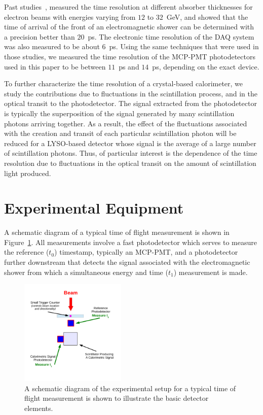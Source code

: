 \documentclass[12pt]{article}
\begin{document}
Past studies~\cite{MCPFastCaloNIMA}, measured the time
resolution at different absorber thicknesses for electron beams with
energies varying from $12$ to $32$~GeV, and showed that the 
time of arrival of the front of an electromagnetic shower
can be determined with a precision better than $20$~ps.
The electronic time resolution of the DAQ system was also measured
to be about $6$~ps. Using the same techniques that were used in those studies, 
we measured the time resolution of the MCP-PMT photodetectors
used in this paper to be between $11$~ps and $14$~ps, depending on
the exact device.

To further characterize the time resolution
of a crystal-based calorimeter, we study the contributions due to fluctuations
in the scintillation process, and in the optical transit
to the photodetector. The signal extracted from the photodetector is 
typically the superposition of the signal generated by many 
scintillation photons arriving together. As a result, the effect of 
the fluctuations associated with the creation and transit of 
each particular scintillation photon will be reduced for a LYSO-based 
detector whose signal is the average of a large number of scintillation 
photons. Thus, of particular interest is the dependence of
the time resolution due to fluctuations in the optical transit
on the amount of scintillation light produced.


\section{Experimental Equipment}

A schematic diagram of a typical time of flight measurement
is shown in Figure~\ref{fig:TypicalSchematicDiagram}. All
measurements involve a fast photodetector which serves to
measure the reference ($t_{0}$) timestamp, typically 
an MCP-PMT, and a photodetector further downstream
that detects the signal associated with the
electromagnetic shower from which a simultaneous energy 
and time ($t_{1}$) measurement is made. 

\begin{figure}[H] \centering
\includegraphics[width=0.45\textwidth]{figs/TypicalSchematicDiagram} 
\caption{A schematic diagram of the experimental setup for
a typical time of flight measurement is shown to illustrate the
basic detector elements.} 
\label{fig:TypicalSchematicDiagram}
\end{figure}
\end{document}
